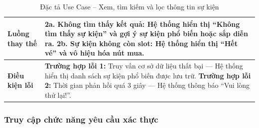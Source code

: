 \begin{table}[H]
\begin{tabularx}{\textwidth}{|l|X|}
\textbf{Luồng thay thế} &
2a. Không tìm thấy kết quả: \newline
\hspace*{1em}Hệ thống hiển thị “Không tìm thấy sự kiện” và gợi ý sự kiện phổ biến hoặc sắp diễn ra. \newline
2b. Sự kiện không còn slot: \newline
\hspace*{1em}Hệ thống hiển thị “Hết vé” và vô hiệu hóa nút mua. \\ \hline
\textbf{Điều kiện lỗi} &
\textbf{Trường hợp lỗi 1:} Truy vấn cơ sở dữ liệu thất bại — Hệ thống hiển thị danh sách sự kiện phổ biến được lưu trữ. \newline
\textbf{Trường hợp lỗi 2:} Thời gian phản hồi quá 3 giây — Hệ thống thông báo “Vui lòng thử lại!”. \\ \hline
\end{tabularx}
\vspace{15pt}
\caption{Đặc tả Use Case -- Xem, tìm kiếm và lọc thông tin sự kiện}
\label{tab:uc_search_event}
\end{table}

\subsubsection{Truy cập chức năng yêu cầu xác thực}

